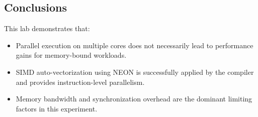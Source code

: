 \subsection*{Conclusions}

This lab demonstrates that:
\begin{itemize}
    \item Parallel execution on multiple cores does not necessarily lead to performance gains
          for memory-bound workloads.
    \item SIMD auto-vectorization using NEON is successfully applied by the compiler and provides
          instruction-level parallelism.
    \item Memory bandwidth and synchronization overhead are the dominant limiting factors in this experiment.
\end{itemize}
